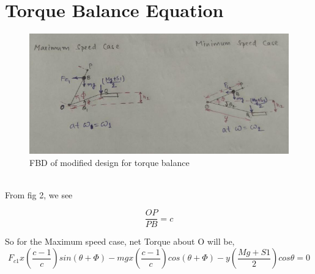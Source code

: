 \documentclass[15pt,a4paper,oneside]{article}
\begin{document}
\section{Torque Balance Equation}
\begin{figure}[h]
	\centerline{\includegraphics[scale=0.62]{pasted4.png}}
	\caption{FBD of modified design for torque balance}
	\label{fig}
	
\end{figure}\\[2cm]
From fig 2, we see

\begin{equation}
	\frac{OP}{PB}=c
	\label{eq:1}
\end{equation}

So for the Maximum speed case, net Torque about O will be,
\begin{equation}
\label{eq:2}
F_{c1}x\left(\frac{c-1}{c}\right)sin(\theta+\Phi)-mgx\left(\frac{c-1}{c}\right)cos(\theta+\Phi)-y\left(\frac{Mg+S1}{2}\right)cos\theta=0
\end{equation}
\end{document}
